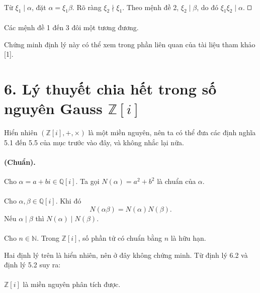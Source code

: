 \documentclass[11pt]{article}
\newcommand{\square}{\mathord{\vcenter{\hrule height .5pt
  \hbox{\vrule width .5pt height 5pt\kern5pt\vrule width .5pt}
  \hrule height .5pt}}}
\begin{document}
\paragraph{}
Từ \(\xi_1\mid\alpha\), đặt \(\alpha=\xi_1\beta\). Rõ ràng
\(\xi_2\nmid\xi_1\). Theo mệnh đề 2, \(\xi_2\mid\beta\), do đó
\(\xi_1\xi_2\mid\alpha\). \(\square\)

\paragraph{}
Các mệnh đề 1 đến 3 đôi một tương đương.

Chứng minh định lý này có thể xem trong phần liên quan của tài liệu tham khảo
[1].

\section*{6. Lý thuyết chia hết trong số nguyên Gauss \(\mathbb Z[i]\)}

Hiển nhiên \((\mathbb Z[i],+,\times)\) là một miền nguyên, nên ta có thể đưa
các định nghĩa 5.1 đến 5.5 của mục trước vào đây, và không nhắc lại nữa.

\paragraph{ (Chuẩn).}
Cho \(\alpha=a+bi\in\mathbb Q[i]\). Ta gọi \(N(\alpha)=a^2+b^2\) là chuẩn của
\(\alpha\).

\paragraph{}
Cho \(\alpha,\beta\in\mathbb Q[i]\). Khi đó
\[
  N(\alpha\beta)=N(\alpha)N(\beta).
\]
Nếu \(\alpha\mid\beta\) thì \(N(\alpha)\mid N(\beta)\).

\paragraph{}
Cho \(n\in\mathbb N\). Trong \(\mathbb Z[i]\), số phần tử có chuẩn bằng \(n\)
là hữu hạn.

Hai định lý trên là hiển nhiên, nên ở đây không chứng minh. Từ định lý 6.2
và định lý 5.2 suy ra:

\paragraph{}
\(\mathbb Z[i]\) là miền nguyên phân tích được.
\end{document}
